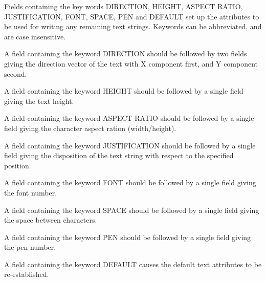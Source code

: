 \documentclass[11pt,nolof,noabs]{starlink}
\begin{document}
\begin{small}
{{{{            \sstitem Fields containing the key words DIRECTION, HEIGHT, ASPECT
            RATIO, JUSTIFICATION, FONT, SPACE, PEN and DEFAULT set up the
            attributes to be used for writing any remaining text strings.
            Keywords can be abbreviated, and are case insensitive.

            \sstitem A field containing the keyword DIRECTION should be followed
            by two fields giving the direction vector of the text with X
            component first, and Y component second.

            \sstitem A field containing the keyword HEIGHT should be followed by
            a single field giving the text height.

            \sstitem A field containing the keyword ASPECT RATIO should be
            followed by a single field giving the character aspect ration
            (width/height).

            \sstitem A field containing the keyword JUSTIFICATION should be
            followed by a single field giving the disposition of the text
            string with respect to the specified position.

            \sstitem A field containing the keyword FONT should be followed by a
            single field giving the font number.

            \sstitem A field containing the keyword SPACE should be followed by a
            single field giving the space between characters.

            \sstitem A field containing the keyword PEN should be followed by a
            single field giving the pen number.

            \sstitem A field containing the keyword DEFAULT causes the default
            text attributes to be re-established.
         }
      }
   }
}

\end{small}
\end{document}

